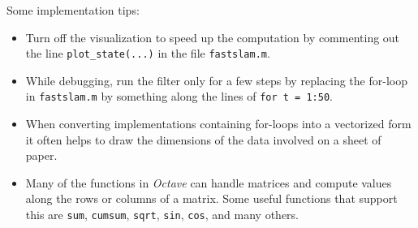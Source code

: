 \documentclass[12pt]{article}
\begin{document}
Some implementation tips:
\begin{itemize}
  \item
    Turn off the visualization to speed up the computation by
    commenting out the line \texttt{plot\_state(...)} in the file
    \texttt{fastslam.m}.
  \item
    While debugging, run the filter only for a few steps by
    replacing the for-loop in \texttt{fastslam.m} by
    something along the lines of \texttt{for t = 1:50}.
  \item
    When converting implementations containing for-loops into a
    vectorized form it often helps to draw the dimensions of the data
    involved on a sheet of paper.
  \item
    Many of the functions in \emph{Octave} can handle matrices and
    compute values along the rows or columns of a matrix. Some useful
    functions that support this are \texttt{sum}, \texttt{cumsum},
    \texttt{sqrt}, \texttt{sin}, \texttt{cos}, and many others.
\end{itemize}
\end{document}
